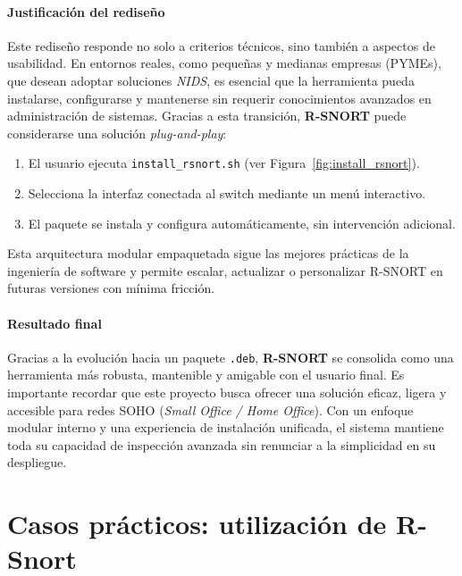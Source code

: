 \documentclass[12pt,a4paper]{report}
\begin{document}
\subsubsection{Justificación del rediseño}

Este rediseño responde no solo a criterios técnicos, sino también a aspectos de usabilidad. En entornos reales, como pequeñas y medianas empresas (PYMEs), que desean adoptar soluciones \textit{NIDS}, es esencial que la herramienta pueda instalarse, configurarse y mantenerse sin requerir conocimientos avanzados en administración de sistemas. Gracias a esta transición, \textbf{R-SNORT} puede considerarse una solución \textit{plug-and-play}:

\begin{enumerate}
	\item El usuario ejecuta \texttt{install\_rsnort.sh} (ver Figura~\ref{fig:install_rsnort}).
	\item Selecciona la interfaz conectada al switch mediante un menú interactivo.
	\item El paquete se instala y configura automáticamente, sin intervención adicional.
\end{enumerate}

Esta arquitectura modular empaquetada sigue las mejores prácticas de la ingeniería de software y permite escalar, actualizar o personalizar R-SNORT en futuras versiones con mínima fricción.

\pagebreak

\subsubsection{Resultado final}

Gracias a la evolución hacia un paquete \texttt{.deb}, \textbf{R-SNORT} se consolida como una herramienta más robusta, mantenible y amigable con el usuario final. Es importante recordar que este proyecto busca ofrecer una solución eficaz, ligera y accesible para redes SOHO (\textit{Small Office / Home Office}). Con un enfoque modular interno y una experiencia de instalación unificada, el sistema mantiene toda su capacidad de inspección avanzada sin renunciar a la simplicidad en su despliegue.



\chapter{Casos prácticos: utilización de R-Snort}
\end{document}
